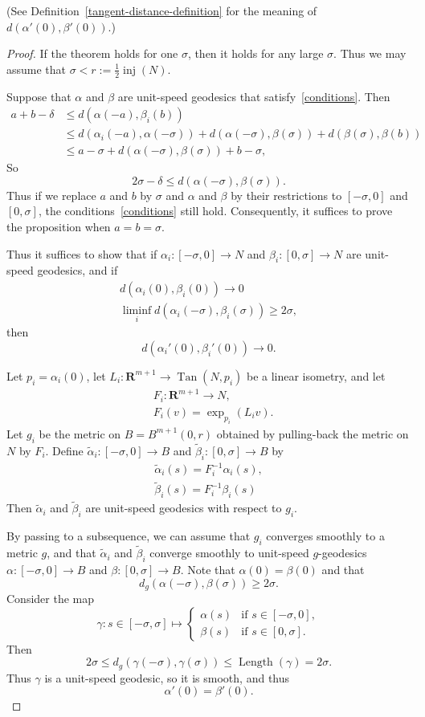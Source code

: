 \documentclass{amsart}
\newcommand{\talpha}{\tilde\alpha}
\newcommand{\inj}{\operatorname{inj}}    %
\newcommand{\RR}{\mathbf{R}}  %
\newcommand{\Tan}{\operatorname{Tan}}
\newcommand{\Length}{\operatorname{Length}}
\newcommand{\tbeta}{\tilde \beta}
\theoremstyle{definition}
\theoremstyle{definition}
\begin{document}
(See Definition~\ref{tangent-distance-definition} for the meaning of $d(\alpha'(0),\beta'(0))$.)

\begin{proof}
If the theorem holds for one $\sigma$, then it holds for any large $\sigma$.
Thus we may assume that $\sigma< r:=\frac12\inj(N)$.

Suppose that $\alpha$ and $\beta$ are unit-speed geodesics that satisfy~\eqref{conditions}.
Then
\begin{align*}
a+b-\delta
&\le
d(\alpha(-a),\beta_i(b)) \\
&\le 
d(\alpha_i(-a), \alpha(-\sigma)) + d(\alpha(-\sigma),\beta(\sigma)) + d(\beta(\sigma),\beta(b)) \\
&\le 
a-\sigma + d(\alpha(-\sigma),\beta(\sigma))  + b -\sigma,
\end{align*}
So
\[
2\sigma -\delta \le d(\alpha(-\sigma), \beta(\sigma)).
\] 
Thus if we replace $a$ and $b$ by $\sigma$ and $\alpha$ and $\beta$
by their restrictions to $[-\sigma,0]$ and $[0,\sigma]$, the conditions~\eqref{conditions}
still hold.  Consequently, it suffices to prove the proposition when $a=b=\sigma$.

Thus it suffices to show that if $\alpha_i:[-\sigma,0]\to N$ and $\beta_i:[0,\sigma] \to N$
are unit-speed geodesics, and if
\begin{gather*}
d(\alpha_i(0), \beta_i(0)) \to  0\\
\liminf_i d(\alpha_i(-\sigma), \beta_i(\sigma)) \ge 2\sigma,
\end{gather*}
then 
\[
  d(\alpha_i'(0), \beta_i'(0)) \to 0.
\]

Let $p_i=\alpha_i(0)$, 
let $L_i: \RR^{m+1}\to \Tan(N,p_i)$ be a linear isometry,
and let
\begin{align*}
&F_i:\RR^{m+1}\to N, \\
&F_i(v) = \exp_{p_i}(L_iv).
\end{align*}
Let $g_i$ be the metric on $B=B^{m+1}(0,r)$ obtained
by pulling-back the metric on $N$ by $F_i$.
Define $\talpha_i:[-\sigma,0] \to B$ and $\tbeta_i: [0,\sigma] \to B$
by
\begin{gather*}
\talpha_i(s) = F_i^{-1}\alpha_i(s), \\
\tbeta_i(s) = F_i^{-1}\beta_i(s)
\end{gather*}
Then $\talpha_i$ and $\tbeta_i$ are unit-speed 
geodesics with respect to $g_i$.

By passing to a subsequence, we can assume that $g_i$ converges smoothly
to a metric $g$, and that $\talpha_i$ and $\tbeta_i$ converge smoothly
to unit-speed $g$-geodesics $\alpha:[-\sigma,0]\to B$ and $\beta:[0,\sigma] \to B$.
Note that $\alpha(0)=\beta(0)$ and that
\[
  d_g(\alpha(-\sigma),\beta(\sigma)) \ge 2\sigma.
\]
Consider the map
\[
\gamma: s\in [-\sigma,\sigma]
\mapsto
\begin{cases}
\alpha(s) &\text{if $s\in [-\sigma,0]$}, \\
\beta(s) &\text{if $s\in [0,\sigma]$}.
\end{cases}
\]
Then
\[
  2\sigma \le d_g(\gamma(-\sigma),\gamma(\sigma)) \le \Length(\gamma)=2\sigma.
\]
Thus $\gamma$ is a unit-speed geodesic, so it is smooth, and thus
\[
\alpha'(0)=\beta'(0).
\]
\end{proof}
\end{document}
